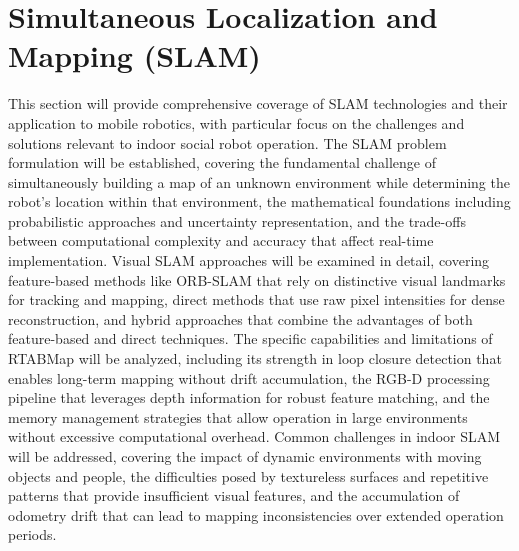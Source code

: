 \section{Simultaneous Localization and Mapping (SLAM)}
This section will provide comprehensive coverage of SLAM technologies and their application to mobile robotics, with particular focus on the challenges and solutions relevant to indoor social robot operation. The SLAM problem formulation will be established, covering the fundamental challenge of simultaneously building a map of an unknown environment while determining the robot's location within that environment, the mathematical foundations including probabilistic approaches and uncertainty representation, and the trade-offs between computational complexity and accuracy that affect real-time implementation. Visual SLAM approaches will be examined in detail, covering feature-based methods like ORB-SLAM that rely on distinctive visual landmarks for tracking and mapping, direct methods that use raw pixel intensities for dense reconstruction, and hybrid approaches that combine the advantages of both feature-based and direct techniques. The specific capabilities and limitations of RTABMap will be analyzed, including its strength in loop closure detection that enables long-term mapping without drift accumulation, the RGB-D processing pipeline that leverages depth information for robust feature matching, and the memory management strategies that allow operation in large environments without excessive computational overhead. Common challenges in indoor SLAM will be addressed, covering the impact of dynamic environments with moving objects and people, the difficulties posed by textureless surfaces and repetitive patterns that provide insufficient visual features, and the accumulation of odometry drift that can lead to mapping inconsistencies over extended operation periods.

